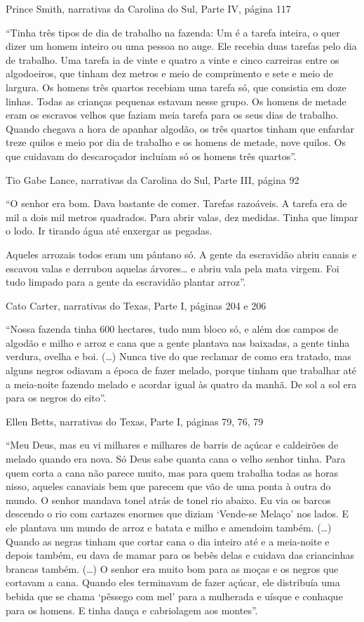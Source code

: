Prince Smith, narrativas da Carolina do Sul, Parte IV, página 117

``Tinha três tipos de dia de trabalho na fazenda: Um é a tarefa inteira,
o quer dizer um homem inteiro ou uma pessoa no auge. Ele recebia duas
tarefas pelo dia de trabalho. Uma tarefa ia de vinte e quatro a vinte e
cinco carreiras entre os algodoeiros, que tinham dez metros e meio de
comprimento e sete e meio de largura. Os homens três quartos recebiam
uma tarefa só, que consistia em doze linhas. Todas as crianças pequenas
estavam nesse grupo. Os homens de metade eram os escravos velhos que
faziam meia tarefa para os seus dias de trabalho. Quando chegava a hora
de apanhar algodão, os três quartos tinham que enfardar treze quilos e
meio por dia de trabalho e os homens de metade, nove quilos. Os que
cuidavam do descaroçador incluíam só os homens três quartos''.

Tio Gabe Lance, narrativas da Carolina do Sul, Parte III, página 92

``O senhor era bom. Dava bastante de comer. Tarefas razoáveis. A tarefa
era de mil a dois mil metros quadrados. Para abrir valas, dez medidas.
Tinha que limpar o lodo. Ir tirando água até enxergar as pegadas.

Aqueles arrozais todos eram um pântano só. A gente da escravidão abriu
canais e escavou valas e derrubou aquelas árvores\ldots{} e abriu vala
pela mata virgem. Foi tudo limpado para a gente da escravidão plantar
arroz''.

Cato Carter, narrativas do Texas, Parte I, páginas 204 e 206

``Nossa fazenda tinha 600 hectares, tudo num bloco só, e além dos campos
de algodão e milho e arroz e cana que a gente plantava nas baixadas, a
gente tinha verdura, ovelha e boi. (\ldots{}) Nunca tive do que reclamar
de como era tratado, mas alguns negros odiavam a época de fazer melado,
porque tinham que trabalhar até a meia-noite fazendo melado e acordar
igual às quatro da manhã. De sol a sol era para os negros do eito''.

Ellen Betts, narrativas do Texas, Parte I, páginas 79, 76, 79

``Meu Deus, mas eu vi milhares e milhares de barris de açúcar e
caldeirões de melado quando era nova. Só Deus sabe quanta cana o velho
senhor tinha. Para quem corta a cana não parece muito, mas para quem
trabalha todas as horas nisso, aqueles canaviais bem que parecem que vão
de uma ponta à outra do mundo. O senhor mandava tonel atrás de tonel rio
abaixo. Eu via os barcos descendo o rio com cartazes enormes que diziam
`Vende-se Melaço' nos lados. E ele plantava um mundo de arroz e batata e
milho e amendoim também. (\ldots{}) Quando as negras tinham que cortar
cana o dia inteiro até e a meia-noite e depois também, eu dava de mamar
para os bebês delas e cuidava das criancinhas brancas também. (\ldots{})
O senhor era muito bom para as moças e os negros que cortavam a cana.
Quando eles terminavam de fazer açúcar, ele distribuía uma bebida que se
chama `pêssego com mel' para a mulherada e uísque e conhaque para os
homens. E tinha dança e cabriolagem aos montes''.


